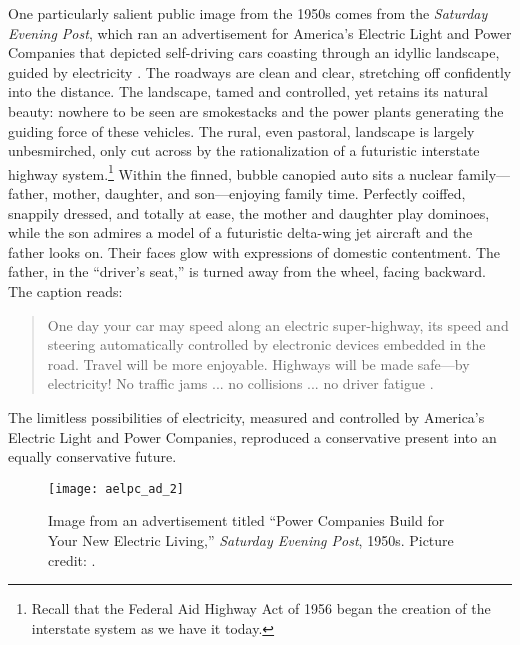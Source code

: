 One particularly salient public image from the 1950s comes from the
\emph{Saturday Evening Post}, which ran an advertisement for America's
Electric Light and Power Companies that depicted self-driving cars
coasting through an idyllic landscape, guided by electricity
\cite{weber}. The roadways 
are clean and clear, stretching off confidently into the distance. The
landscape, tamed and controlled, yet retains its natural beauty:
nowhere to be seen are smokestacks and the power plants generating the
guiding force of these vehicles. The rural, even
pastoral, landscape is largely unbesmirched, only cut across by the
rationalization of a futuristic interstate highway system.\footnote{Recall that
the Federal Aid Highway Act of 1956 began the creation of the
interstate system as we have it today.} Within the finned, bubble
canopied auto sits a nuclear family---father,
mother, daughter, and son---enjoying family time.
Perfectly coiffed, snappily dressed, and totally at ease, the mother
and daughter play dominoes, while the son admires a model of a futuristic
delta-wing jet aircraft and the father looks on. Their faces glow with
expressions of domestic contentment. The father, in the ``driver's
seat,'' is turned away from the wheel, facing backward. The caption reads: 
\begin{quote}
One day your car may speed along an electric super-highway, its speed
and steering automatically controlled by electronic devices embedded
in the road. Travel will be more enjoyable. Highways will be made
safe---by electricity! No traffic jams ... no collisions ... no
driver fatigue \cite{weber}.
\end{quote}
The limitless possibilities of electricity, measured and controlled by
America's Electric Light and Power Companies, reproduced a conservative
present into an equally conservative future. 

\begin{figure}[h]
  \begin{center}
  \texttt{[image: aelpc\_ad\_2]}
  \end{center}
  \caption{Image from an advertisement titled ``Power Companies Build
    for Your New Electric Living,'' \emph{Saturday Evening Post}, 1950s.
    Picture credit: \cite{novakPicture}.}
\end{figure}

